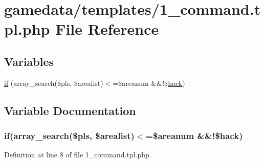 \hypertarget{1__command_8tpl_8php}{\section{gamedata/templates/1\+\_\+command.tpl.\+php File Reference}
\label{1__command_8tpl_8php}
}
\subsection*{Variables}
\begin{DoxyCompactItemize}
\item 
\hyperlink{1__command_8tpl_8php_a057f7fcb3c6439e4c8a0f8be79183b9f}{if} (array\+\_\+search(\$pls, \$arealist)$<$=\$areanum \&\&!\$\hyperlink{item2_8func_8php_a175c54d1456f4301cffabb23e5606bb8}{hack})
\end{DoxyCompactItemize}


\subsection{Variable Documentation}
\hypertarget{1__command_8tpl_8php_a057f7fcb3c6439e4c8a0f8be79183b9f}{
\subsubsection[{if}]{\setlength{\rightskip}{0pt plus 5cm}if(array\+\_\+search(\$pls, \$arealist)$<$=\$areanum \&\&!\${\bf hack})}}\label{1__command_8tpl_8php_a057f7fcb3c6439e4c8a0f8be79183b9f}


Definition at line 8 of file 1\+\_\+command.\+tpl.\+php.

